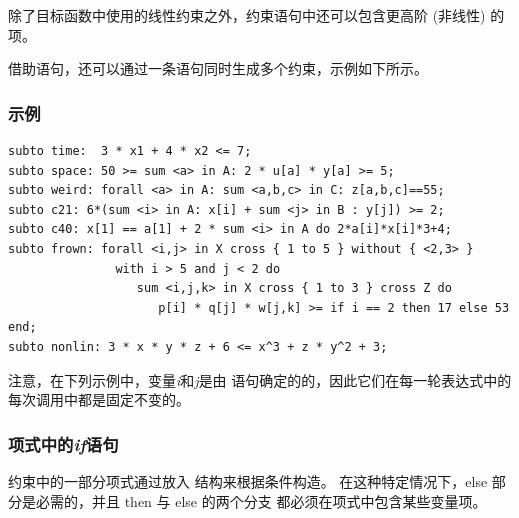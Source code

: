 除了目标函数中使用的线性约束之外，约束语句中还可以包含更高阶 (非线性) 的项。

借助语句，还可以通过一条语句同时生成多个约束，示例如下所示。

\subsubsection{示例}
{\small
\begin{verbatim}
subto time:  3 * x1 + 4 * x2 <= 7;
subto space: 50 >= sum <a> in A: 2 * u[a] * y[a] >= 5;
subto weird: forall <a> in A: sum <a,b,c> in C: z[a,b,c]==55;
subto c21: 6*(sum <i> in A: x[i] + sum <j> in B : y[j]) >= 2;
subto c40: x[1] == a[1] + 2 * sum <i> in A do 2*a[i]*x[i]*3+4;
subto frown: forall <i,j> in X cross { 1 to 5 } without { <2,3> }
               with i > 5 and j < 2 do
                  sum <i,j,k> in X cross { 1 to 3 } cross Z do
                     p[i] * q[j] * w[j,k] >= if i == 2 then 17 else 53 end;
subto nonlin: 3 * x * y * z + 6 <= x^3 + z * y^2 + 3;
\end{verbatim}
}
\noindent 注意，在下列示例中，变量\emph{i}和\emph{j}是由
语句确定的的，因此它们在每一轮表达式中的每次调用中都是固定不变的。

\subsubsection{项式中的\emph{if}语句}

约束中的一部分项式通过放入  结构来根据条件构造。
在这种特定情况下，else 部分是必需的，并且 then 与 else 的两个分支
都必须在项式中包含某些变量项。

